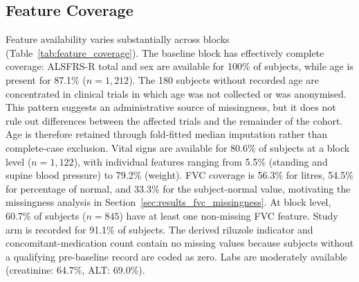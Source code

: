 \subsection{Feature Coverage}
\label{subsec:results_coverage}
Feature availability varies substantially across blocks (Table~\ref{tab:feature_coverage}).
The baseline block has effectively complete coverage: ALSFRS-R total and sex are available for 100\% of subjects, while age is present for 87.1\% ($n\!=\!1{,}212$).
The 180 subjects without recorded age are concentrated in clinical trials in which age was not collected or was anonymised. This pattern suggests an administrative source of missingness, but it does not rule out differences between the affected trials and the remainder of the cohort. Age is therefore retained through fold-fitted median imputation rather than complete-case exclusion.
Vital signs are available for 80.6\% of subjects at a block level ($n\!=\!1{,}122$), with individual features ranging from 5.5\% (standing and supine blood pressure) to 79.2\% (weight).
FVC coverage is 56.3\% for litres, 54.5\% for percentage of normal, and 33.3\% for the subject-normal value, motivating the missingness analysis in Section~\ref{sec:results_fvc_missingness}.
At block level, 60.7\% of subjects ($n\!=\!845$) have at least one non-missing FVC feature.
Study arm is recorded for 91.1\% of subjects. The derived riluzole indicator and concomitant-medication count contain no missing values because subjects without a qualifying pre-baseline record are coded as zero.
Labs are moderately available (creatinine: 64.7\%, ALT: 69.0\%).



